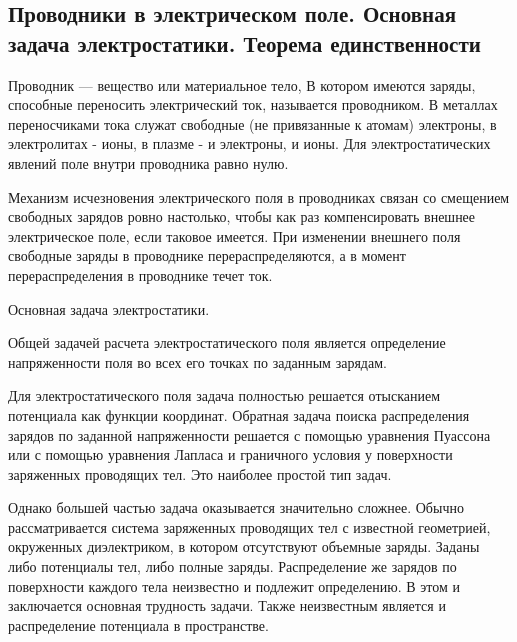 \subsection{Проводники в электрическом поле. Основная задача электростатики. Теорема единственности}

\begin{definition}
    Проводник — вещество или материальное тело, В котором имеются заряды, способные переносить электрический ток, 
    называется проводником. В металлах переносчиками тока служат свободные (не привязанные к атомам) электроны, 
    в электролитах - ионы, в плазме - и электроны, и ионы. Для электростатических явлений поле внутри проводника равно нулю.
\end{definition}

Механизм исчезновения электрического поля в проводниках связан со смещением свободных зарядов ровно настолько, 
чтобы как раз компенсировать внешнее электрическое поле, если таковое имеется. При изменении внешнего поля свободные заряды 
в проводнике перераспределяются, а в момент перераспределения в проводнике течет ток.

\begin{remark}
    Основная задача электростатики.

    Общей задачей расчета электростатического поля является определение напряженности поля во всех его точках по заданным зарядам. 

    Для электростатического поля задача полностью решается отысканием потенциала как функции координат. Обратная задача поиска 
    распределения зарядов по заданной напряженности решается с помощью уравнения Пуассона или с помощью уравнения Лапласа
    и граничного условия у поверхности заряженных проводящих тел. Это наиболее простой тип задач. 

    Однако большей частью задача оказывается значительно сложнее. Обычно рассматривается система заряженных проводящих тел с 
    известной геометрией, окруженных диэлектриком, в котором отсутствуют объемные заряды. Заданы либо потенциалы тел, либо полные заряды. 
    Распределение же зарядов по поверхности каждого тела неизвестно и подлежит определению. В этом и заключается основная трудность задачи. 
    Также неизвестным является и распределение потенциала в пространстве.
\end{remark}

